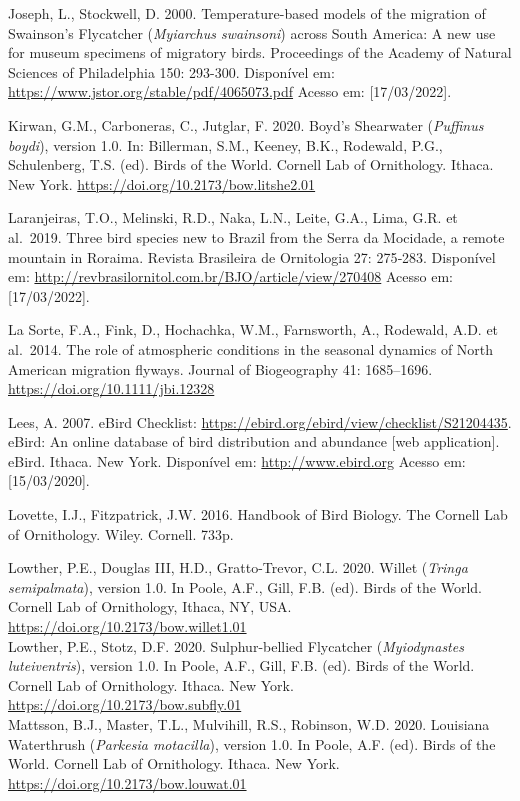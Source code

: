 \documentclass[
  oneside]{scrbook}
\begin{document}
Joseph, L., Stockwell, D. 2000. Temperature-based models of the migration of Swainson's Flycatcher (\emph{Myiarchus swainsoni}) across South America: A new use for museum specimens of migratory birds. Proceedings of the Academy of Natural Sciences of Philadelphia 150: 293-300. Disponível em: \url{https://www.jstor.org/stable/pdf/4065073.pdf} Acesso em: {[}17/03/2022{]}.

Kirwan, G.M., Carboneras, C., Jutglar, F. 2020. Boyd's Shearwater (\emph{Puffinus boydi}), version 1.0. In: Billerman, S.M., Keeney, B.K., Rodewald, P.G., Schulenberg, T.S. (ed). Birds of the World. Cornell Lab of Ornithology. Ithaca. New York. \url{https://doi.org/10.2173/bow.litshe2.01}

Laranjeiras, T.O., Melinski, R.D., Naka, L.N., Leite, G.A., Lima, G.R. et al.~2019. Three bird species new to Brazil from the Serra da Mocidade, a remote mountain in Roraima. Revista Brasileira de Ornitologia 27: 275‑283. Disponível em: \url{http://revbrasilornitol.com.br/BJO/article/view/270408} Acesso em: {[}17/03/2022{]}.

La Sorte, F.A., Fink, D., Hochachka, W.M., Farnsworth, A., Rodewald, A.D. et al.~2014. The role of atmospheric conditions in the seasonal dynamics of North American migration flyways. Journal of Biogeography 41: 1685--1696. \url{https://doi.org/10.1111/jbi.12328}

Lees, A. 2007. eBird Checklist: \url{https://ebird.org/ebird/view/checklist/S21204435}. eBird: An online database of bird distribution and abundance {[}web application{]}. eBird. Ithaca. New York. Disponível em: \url{http://www.ebird.org} Acesso em: {[}15/03/2020{]}.

Lovette, I.J., Fitzpatrick, J.W. 2016. Handbook of Bird Biology. The Cornell Lab of
Ornithology. Wiley. Cornell. 733p.

Lowther, P.E., Douglas III, H.D., Gratto-Trevor, C.L. 2020. Willet (\emph{Tringa semipalmata}), version 1.0. In Poole, A.F., Gill, F.B. (ed). Birds of the World. Cornell Lab of Ornithology, Ithaca, NY, USA. \url{https://doi.org/10.2173/bow.willet1.01}\\
Lowther, P.E., Stotz, D.F. 2020. Sulphur-bellied Flycatcher (\emph{Myiodynastes luteiventris}), version 1.0. In Poole, A.F., Gill, F.B. (ed). Birds of the World. Cornell Lab of Ornithology. Ithaca. New York. \url{https://doi.org/10.2173/bow.subfly.01}\\
Mattsson, B.J., Master, T.L., Mulvihill, R.S., Robinson, W.D. 2020. Louisiana Waterthrush (\emph{Parkesia motacilla}), version 1.0. In Poole, A.F. (ed). Birds of the World. Cornell Lab of Ornithology. Ithaca. New York. \url{https://doi.org/10.2173/bow.louwat.01}
\end{document}
